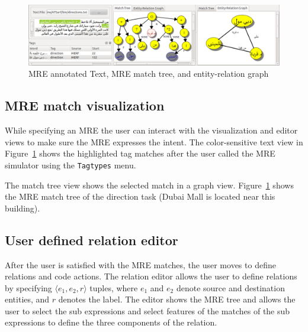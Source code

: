 \begin{figure}[tb!]
  \centering
  \includegraphics[width=\textwidth]{figures/treegraph}
  \caption{MRE annotated Text, MRE match tree, and entity-relation graph}
  \label{fig:treegraph}
\end{figure}

\vspace{-1em}
\subsection{MRE match visualization}

While specifying an MRE the user can interact with the visualization and editor views
to make sure the MRE expresses the intent. 
The color-sensitive text view in Figure~\ref{fig:treegraph} shows 
the highlighted tag matches after the user called the MRE simulator using 
the {\tt Tagtypes} menu. 

The match tree view shows the selected match in a graph view.
Figure~\ref{fig:treegraph} shows the MRE match tree of the direction task 
(Dubai Mall is located near this building). 


\subsection{User defined relation editor}

After the user is satisfied with the MRE matches, 
the user moves to define relations and code actions. 
The relation editor allows the user to define relations 
by specifying $\langle e_1,e_2,r\rangle$ tuples, 
where $e_1$ and $e_2$ denote source and destination entities, and $r$ denotes 
the label.
The editor shows the MRE tree and allows the user to select the sub 
expressions and select features 
of the matches of the sub expressions to define the three components of the relation. 

